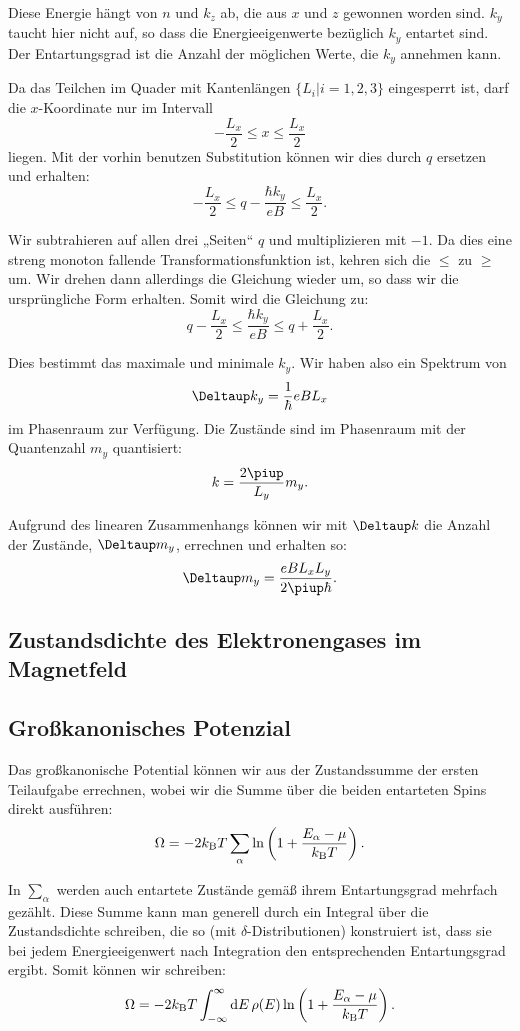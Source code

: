 Diese Energie hängt von $n$ und $k_z$ ab, die aus $x$ und $z$ gewonnen worden
sind. $k_y$ taucht hier nicht auf, so dass die Energieeigenwerte bezüglich
$k_y$ entartet sind. Der Entartungsgrad ist die Anzahl der möglichen Werte, die
$k_y$ annehmen kann.

Da das Teilchen im Quader mit Kantenlängen $\{ L_i | i = 1, 2, 3 \}$
eingesperrt ist, darf die $x$-Koordinate nur im Intervall
\[
    - \frac{L_x}2 \leq x \leq \frac{L_x}2
\]
liegen. Mit der vorhin benutzen Substitution können wir dies durch $q$ ersetzen
und erhalten:
\[
    - \frac{L_x}2 \leq q - \frac{\hbar k_y}{eB} \leq \frac{L_x}2.
\]

Wir subtrahieren auf allen drei „Seiten“ $q$ und multiplizieren mit $-1$. Da
dies eine streng monoton fallende Transformationsfunktion ist, kehren sich die
$\leq$ zu $\geq$ um. Wir drehen dann allerdings die Gleichung wieder um, so
dass wir die ursprüngliche Form erhalten. Somit wird die Gleichung zu:
\[
    q - \frac{L_x}2 \leq \frac{\hbar k_y}{eB} \leq q + \frac{L_x}2.
\]

Dies bestimmt das maximale und minimale $k_y$. Wir haben also ein Spektrum von
\[
    \Deltaup k_y = \frac1\hbar e B L_x
\]
im Phasenraum zur Verfügung. Die Zustände sind im Phasenraum mit der
Quantenzahl $m_y$ quantisiert:
\[
    k = \frac{2\piup}{L_y} m_y.
\]

Aufgrund des linearen Zusammenhangs können wir mit $\Deltaup k$ die Anzahl der
Zustände, $\Deltaup m_y$, errechnen und erhalten so:
\[
    \Deltaup m_y = \frac{e B L_x L_y}{2 \piup \hbar}.
\]

\subsection{Zustandsdichte des Elektronengases im Magnetfeld}

\fehlt

\subsection{Großkanonisches Potenzial}

Das großkanonische Potential können wir aus der Zustandssumme der ersten
Teilaufgabe errechnen, wobei wir die Summe über die beiden entarteten Spins
direkt ausführen:
\[
    \Omega = - 2 \kB T \sum_\alpha \ln\del{1 + \frac{E_\alpha - \mu}{\kB T}}.
\]

In $\sum_\alpha$ werden auch entartete Zustände gemäß ihrem Entartungsgrad
mehrfach gezählt. Diese Summe kann man generell durch ein Integral über die
Zustandsdichte schreiben, die so (mit $\delta$-Distributionen) konstruiert ist,
dass sie bei jedem Energieeigenwert nach Integration den entsprechenden
Entartungsgrad ergibt. Somit können wir schreiben:
\[
    \Omega = - 2 \kB T \int_{-\infty}^\infty \dif E \, \rho(E) \ln\del{1 + \frac{E_\alpha - \mu}{\kB T}}.
\]

